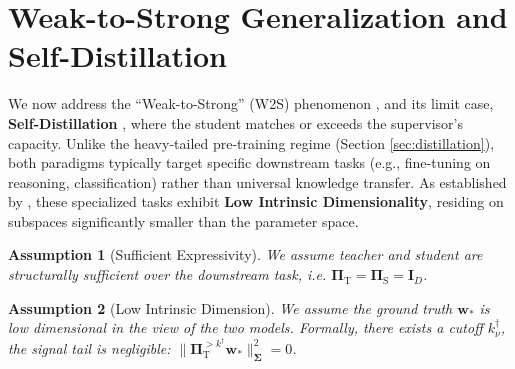 \documentclass{article}
\theoremstyle{definition}
\theoremstyle{definition}
\theoremstyle{plain}
\theoremstyle{plain}
\newtheorem{assumption}{Assumption}
\theoremstyle{plain}
\theoremstyle{plain}
\theoremstyle{plain}
\newcommand{\bs}[1]{\boldsymbol{\mathbf{#1}}}
\newcommand{\te}{\mathrm{T}}
\newcommand{\st}{\mathrm{S}}
\newcommand{\w}{\mathbf{w}}
\newcommand{\id}{\mathbf{I}}
\begin{document}


\section{Weak-to-Strong Generalization and Self-Distillation}
\label{sec:w2s_generalization}

We now address the ``Weak-to-Strong'' (W2S) phenomenon \citep{Burns2023WeaktoStrongGE}, and its limit case, \textbf{Self-Distillation} \citep{furlanello2018bornneuralnetworks}, where the student matches or exceeds the supervisor's capacity.
Unlike the heavy-tailed pre-training regime (Section \ref{sec:distillation}), both paradigms typically target specific downstream tasks (e.g., fine-tuning on reasoning, classification) rather than universal knowledge transfer.
As established by \citet{aghajanyan2020intrinsicdimensionalityexplainseffectiveness}, these specialized tasks exhibit \textbf{Low Intrinsic Dimensionality}, residing on subspaces significantly smaller than the parameter space.

\begin{assumption}[Sufficient Expressivity]
\label{assump:full_express}
    We assume teacher and student are structurally sufficient over the downstream task, i.e. $\bs \Pi_\te=\bs \Pi_\st = \id_D$. 
\end{assumption}

\begin{assumption}[Low Intrinsic Dimension]
\label{assump:intrinsic_dim}
    We assume the ground truth $\mathbf{w}_*$ is low dimensional in the view of the two models. Formally, there exists a cutoff $k^\dagger_\nu$, the signal tail is negligible: $\| \bs \Pi_\te^{> k^\dagger} \w_* \|_{\bs\Sigma}^2 = 0$.
\end{assumption}
\end{document}
